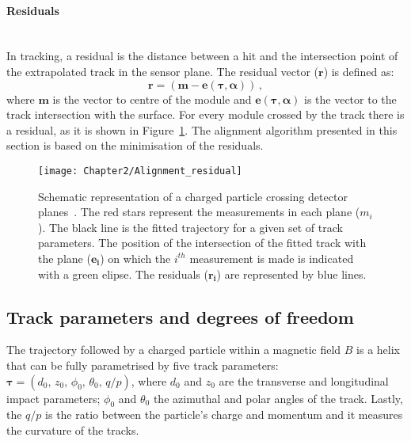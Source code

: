 \paragraph{Residuals}\mbox{}\\
In tracking, a residual is the distance between a hit and the intersection point of 
the extrapolated track in the sensor plane. The residual vector ($\bm{r}$) is defined as:
\begin{equation*}
	\bm{r} = (\bm{m} - \bm{e}(\bm{\tau}, \bm{\alpha}) )\, ,
\end{equation*}
where $\bm{m}$ is the vector to centre of the module and $\bm{e}(\bm{\tau}, \bm{\alpha})$
is the vector to the track intersection with the surface.  For every module crossed by the track there is a residual,
as it is shown in Figure~\ref{fig:Chap2:Alignment:Residual}. %
The alignment algorithm presented in this section is based on the minimisation of the residuals.

\begin{figure}
\centering
\texttt{[image: Chapter2/Alignment\_residual]}
\caption{Schematic representation of a charged particle crossing detector planes~\cite{ATLAS:2020ixw}.  
The red stars represent the measurements in each plane ($m_i$). The black line is the 
fitted trajectory for a given set of track parameters. The position of the intersection of the fitted 
track with the plane ($\bm{e_{i}}$) on which the $i^{th}$ measurement is made is indicated with a
green elipse. The residuals ($\bm{r_{i}}$) are represented by blue lines.}
\label{fig:Chap2:Alignment:Residual}
\end{figure}


\subsection{Track parameters and degrees of freedom}
The trajectory followed by a charged particle within a magnetic field $B$ is a helix that 
can be fully parametrised by five track parameters: 
$\bm{\tau} = (d_{0},\, z_{0},\, \phi_{0},\, \theta_{0},\, q/p)$, where $d_{0}$ and $z_{0}$  
are the transverse and longitudinal impact parameters; $\phi_{0}$ and $\theta_{0}$ the 
azimuthal and polar angles of the track.  Lastly, the $q/p$ is the ratio between the particle's
charge and momentum and it measures the curvature of the tracks. 

